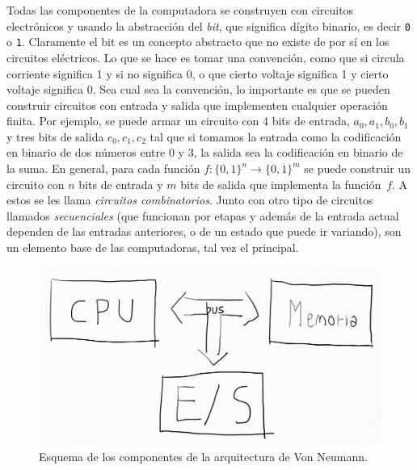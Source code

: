 \documentclass[a4paper, 12pt]{report}
\begin{document}
Todas las componentes de la computadora se construyen con circuitos electrónicos y usando la abstracción del {\sl bit}, que significa dígito binario, es decir {\tt 0} o {\tt 1}. Claramente el bit es un concepto abstracto que no existe de por sí en los circuitos eléctricos. Lo que se hace es tomar una convención, como que si circula corriente significa 1 y si no significa 0, o que cierto voltaje significa 1 y cierto voltaje significa 0. Sea cual sea la convención, lo importante es que se pueden construir circuitos con entrada y salida que implementen cualquier operación finita. Por ejemplo, se puede armar un circuito con 4 bits de entrada, $a_0,a_1,b_0,b_1$ y tres bits de salida $c_0,c_1,c_2$ tal que si tomamos la entrada como la codificación en binario de dos números entre $0$ y $3$, la salida sea la codificación en binario de la suma. En general, para cada función $f:\{0,1\}^n\to\{0,1\}^m$ se puede construir un circuito con $n$ bits de entrada y $m$ bits de salida que implementa la función~$f$. A estos se les llama {\sl circuitos combinatorios}. Junto con otro tipo de circuitos llamados {\sl secuenciales} (que funcionan por etapas y además de la entrada actual dependen de las entradas anteriores, o de un estado que puede ir variando), son un elemento base de las computadoras, tal vez el principal.




\begin{figure}
	\centering
	\includegraphics[scale=0.3]{ArqVN.png}
	\caption{Esquema de los componentes de la arquitectura de Von Neumann.}
	\label{fig-ArqVN}
\end{figure}
\end{document}
